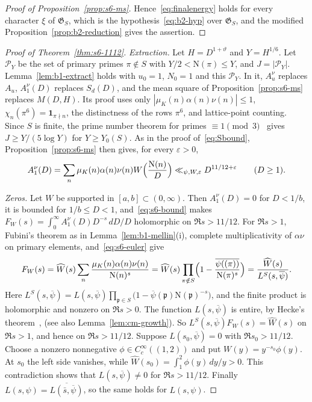 \documentclass[11pt]{article}
\numberwithin{equation}{section}
\newcommand{\N}{\mathrm N}
\newcommand{\muk}{\mu_K}
\newcommand{\ind}{\mathbf1}
\begin{document}
\begin{proof}[Proof of Proposition~\ref{prop:s6-ms}]
Hence~\eqref{eq:finalenergy} holds for every character $\xi$ of $\mathfrak G_S$, which is the
hypothesis~\eqref{eq:b2-hyp} over $\mathfrak G_S$, and the modified Proposition~\ref{prop:b2-reduction} gives
the assertion.
\end{proof}

\begin{proof}[Proof of Theorem~\ref{thm:s6-1112}]
\emph{Extraction.} Let $H=D^{1+\vartheta}$ and $Y=H^{1/6}$. Let $\mathcal P_Y$ be the set of primary primes
$\pi\notin S$ with $Y/2<\N(\pi)\le Y$, and $J=|\mathcal P_Y|$. Lemma~\ref{lem:b1-extract} holds with $u_0=1$,
$N_0=1$ and this $\mathcal P_Y$. In it, $A_u^\nu$ replaces $A_u$, $A_1^\nu(D)$ replaces $S_d(D)$, and the mean
square of Proposition~\ref{prop:s6-ms} replaces $M(D,H)$. Its proof uses only
$|\muk(n)\alpha(n)\nu(n)|\le1$, $\chi_n(\pi^6)=\ind_{\pi\nmid n}$, the distinctness of the rows $\pi^6$, and
lattice-point counting. Since $S$ is finite, the prime number theorem for primes $\equiv1\pmod3$~\cite{Lan03} gives
$J\ge Y/(5\log Y)$ for $Y\ge Y_0(S)$. As in the proof of~\eqref{eq:Sbound}, Proposition~\ref{prop:s6-ms} then
gives, for every $\varepsilon>0$,
\begin{equation}\label{eq:s6-bound}
 A_1^\nu(D)=\sum_n\muk(n)\alpha(n)\nu(n)W\Bigl(\frac{\N(n)}D\Bigr)\ll_{\psi,W,\varepsilon}D^{11/12+\varepsilon}
 \qquad(D\ge1).
\end{equation}

\emph{Zeros.} Let $W$ be supported in $[a,b]\subset(0,\infty)$. Then $A_1^\nu(D)=0$ for $D<1/b$, it is bounded
for $1/b\le D<1$, and~\eqref{eq:s6-bound} makes $F_W(s)=\int_0^\infty A_1^\nu(D)D^{-s}\,dD/D$ holomorphic on $\Re s>11/12$. For
$\Re s>1$, Fubini's theorem as in Lemma~\ref{lem:b1-mellin}(i), complete multiplicativity of $\alpha\nu$ on
primary elements, and~\eqref{eq:s6-euler} give
\begin{equation}\label{eq:d196}
 F_W(s)=\widehat W(s)\sum_n\frac{\muk(n)\alpha(n)\nu(n)}{\N(n)^s}
 =\widehat W(s)\prod_{\pi\notin S}\Bigl(1-\frac{\overline{\psi((\pi))}}{\N(\pi)^s}\Bigr)
 =\frac{\widehat W(s)}{L^S(s,\overline\psi)}.
\end{equation}
Here $L^S(s,\overline\psi)=L(s,\overline\psi)\prod_{\mathfrak p\in S}\bigl(1-\overline\psi(\mathfrak p)
\N(\mathfrak p)^{-s}\bigr)$, and the finite product is holomorphic and nonzero on $\Re s>0$. The function
$L(s,\overline\psi)$ is entire, by Hecke's theorem~\cite{Hec20}, \cite[Ch.~VII, \S8]{Neukirch} (see also
Lemma~\ref{lem:cm-growth}). So $L^S(s,\overline\psi)F_W(s)=\widehat W(s)$ on $\Re s>1$, and hence on
$\Re s>11/12$. Suppose $L(s_0,\overline\psi)=0$ with $\Re s_0>11/12$. Choose a nonzero nonnegative
$\phi\in C_c^\infty((1,2))$ and put $W(y)=y^{-s_0}\phi(y)$. At $s_0$ the left side vanishes, while
$\widehat W(s_0)=\int_1^2\phi(y)\,dy/y>0$. This contradiction shows that $L(s,\overline\psi)\ne0$ for
$\Re s>11/12$. Finally $L(s,\psi)=\overline{L(\bar s,\overline\psi)}$, so the same holds for $L(s,\psi)$.
\end{proof}
\end{document}
